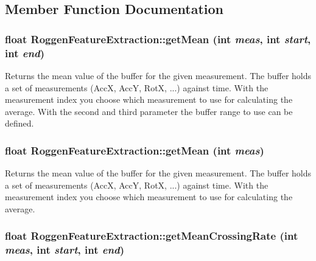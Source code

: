 \subsection{Member Function Documentation}
\hypertarget{classRoggenFeatureExtraction_a63dbff3c6517270dbea027ca4f47cb1c}{
\subsubsection[{getMean}]{\setlength{\rightskip}{0pt plus 5cm}float RoggenFeatureExtraction::getMean (int {\em meas}, \/  int {\em start}, \/  int {\em end})}}
\label{classRoggenFeatureExtraction_a63dbff3c6517270dbea027ca4f47cb1c}
Returns the mean value of the buffer for the given measurement. The buffer holds a set of measurements (AccX, AccY, RotX, ...) against time. With the measurement index you choose which measurement to use for calculating the average. With the second and third parameter the buffer range to use can be defined. \hypertarget{classRoggenFeatureExtraction_a72a3b28350c7742e030e630615572f4b}{
\subsubsection[{getMean}]{\setlength{\rightskip}{0pt plus 5cm}float RoggenFeatureExtraction::getMean (int {\em meas})}}
\label{classRoggenFeatureExtraction_a72a3b28350c7742e030e630615572f4b}
Returns the mean value of the buffer for the given measurement. The buffer holds a set of measurements (AccX, AccY, RotX, ...) against time. With the measurement index you choose which measurement to use for calculating the average. \hypertarget{classRoggenFeatureExtraction_aa8622eb806834314c8c0b4e3a7f26f2c}{
\subsubsection[{getMeanCrossingRate}]{\setlength{\rightskip}{0pt plus 5cm}float RoggenFeatureExtraction::getMeanCrossingRate (int {\em meas}, \/  int {\em start}, \/  int {\em end})}}
\label{classRoggenFeatureExtraction_aa8622eb806834314c8c0b4e3a7f26f2c}

